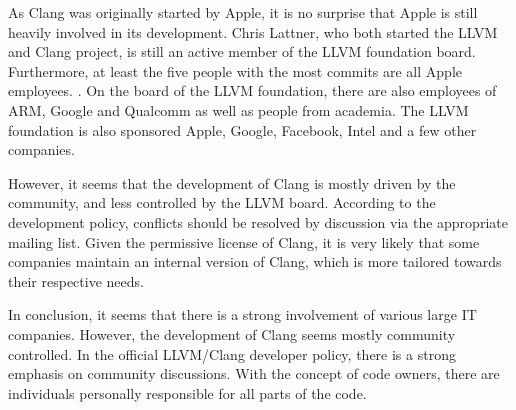 As Clang was originally started by Apple, it is no surprise that Apple is still heavily involved in its development. Chris Lattner, who both started the LLVM and Clang project, is still an active member of the LLVM foundation board. Furthermore, at least the five people with the most commits are all Apple employees. \cite{clang-commits}. On the board of the LLVM foundation, there are also employees of ARM, Google and Qualcomm as well as people from academia.\cite{llvm-board} The LLVM foundation is also sponsored Apple, Google, Facebook, Intel and a few other companies.\cite{llvm-sponsors}

However, it seems that the development of Clang is mostly driven by the community, and less controlled by the LLVM board. According to the development policy, conflicts should be resolved by discussion via the appropriate mailing list. Given the permissive license of Clang, it is very likely that some companies maintain an internal version of Clang, which is more tailored towards their respective needs.

In conclusion, it seems that there is a strong involvement of various large IT companies. However, the development of Clang seems mostly community controlled. In the official LLVM/Clang developer policy, there is a strong emphasis on community discussions. With the concept of code owners, there are individuals personally responsible for all parts of the code. 



